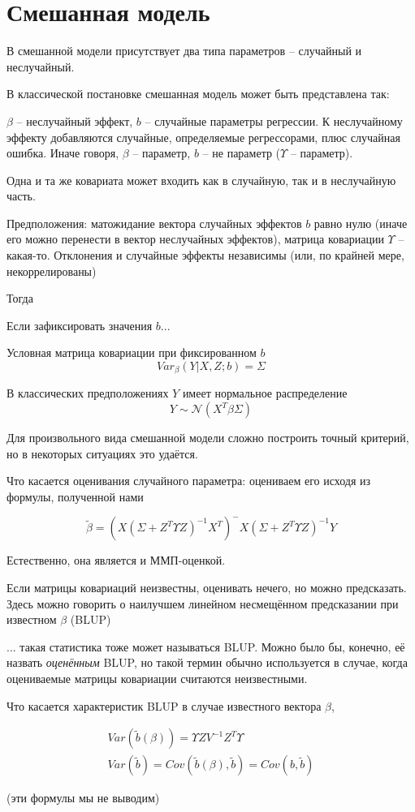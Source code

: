 \documentclass[main.tex]{subfiles}
\begin{document}
\section{ Смешанная модель  }

В смешанной модели присутствует два типа параметров -- случайный и неслучайный.

В классической постановке смешанная модель может быть представлена так: 

 $ \beta $ -- неслучайный эффект, $ b $ -- случайные параметры регрессии.
К неслучайному эффекту добавляются случайные, определяемые регрессорами, плюс случайная ошибка.
Иначе говоря,  $ \beta $ -- параметр, $ b $ -- не параметр ($ \Upsilon $ -- параметр).
\begin{leftbar}
	Одна и та же ковариата может входить как в случайную, так и в неслучайную часть.
\end{leftbar}

Предположения: матожидание вектора случайных эффектов $ b $ равно нулю (иначе его можно перенести в вектор неслучайных эффектов), матрица ковариации $ \Upsilon $ -- какая-то.
Отклонения и случайные эффекты независимы (или, по крайней мере, некоррелированы)

Тогда %

Если зафиксировать значения $ b $...

Условная матрица ковариации при фиксированном $b$ 
\[ Var_\beta(Y|X,Z;b) = \Sigma \]

В классических предположениях $ Y $ имеет нормальное распределение
\[ Y \sim \mathcal N(X^T\beta \Sigma) \] %

Для произвольного вида смешанной модели сложно построить точный критерий, но в некоторых ситуациях это удаётся.

Что касается оценивания случайного параметра:
оцениваем его исходя из формулы, полученной нами

\[ \tilde \beta = (X(\Sigma + Z^T\Upsilon Z)^{-1}X^T)^- X(\Sigma+Z^T\Upsilon Z)^{-1}Y \]

Естественно, она является и ММП-оценкой.

Если матрицы ковариаций неизвестны, оценивать нечего, но можно предсказать.
Здесь можно говорить о наилучшем линейном несмещённом предсказании при известном $ \beta $ (BLUP)

... такая статистика тоже может называться BLUP.
Можно было бы, конечно, её назвать \emph{оценённым}  BLUP, но такой термин обычно используется в случае, когда оцениваемые матрицы ковариации считаются неизвестными.

Что касается характеристик BLUP в случае известного вектора $ \beta $,

\begin{gather*}
	Var(\tilde b (\beta)) = \Upsilon Z V^{-1} Z^T \Upsilon \\
	Var(\tilde b) = Cov(\tilde b (\beta), \tilde b) = Cov(b, \tilde b)
\end{gather*}

(эти формулы мы не выводим)
\end{document}
